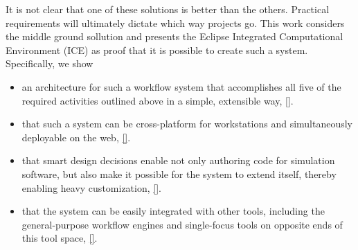 It is not clear that one of these solutions is better than the others.
Practical requirements will ultimately dictate which way projects go. This work
considers the middle ground sollution and presents the Eclipse Integrated
Computational Environment (ICE) as proof that it is possible to create such a
system. Specifically, we show
\begin{itemize}
\item an architecture for such a workflow system that accomplishes all five of
the required activities outlined above in a simple, extensible way, \ref{}.
\item that such a system can be cross-platform for workstations and
simultaneously deployable on the web, \ref{}.
\item that smart design decisions enable not only authoring code for simulation
software, but also make it possible for the system to extend itself, thereby
enabling heavy customization, \ref{}.
\item that the system can be easily integrated with other tools, including the
general-purpose workflow engines and single-focus tools on opposite ends of this
tool space, \ref{}.
\end{itemize}
